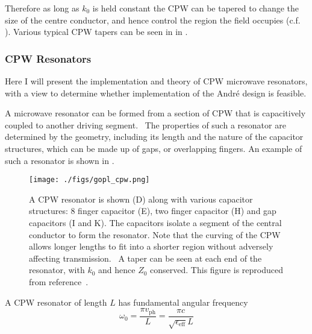 Therefore as long as $k_0$ is held constant the CPW can be tapered to change the
size of the centre conductor, and hence control the region the field occupies
(c.f. ).  Various typical CPW tapers  can be
seen in in .~\cite{Simons2004}

\subsubsection{CPW Resonators}
\label{experiment:mw:resonator}

Here I will present the implementation and theory of CPW microwave resonators,
with a view to determine whether implementation of the Andr\'e design is
feasible.

A microwave resonator can be formed from a section of CPW that is capacitively
coupled to another driving segment.~\cite{Day2003} The properties of such a
resonator are determined by the geometry, including its length and the nature
of the capacitor structures, which can be made up of gaps, or overlapping
fingers. An example of such a resonator is shown in
.~\cite{doi:10.1063/1.3010859, Pain1999}

\begin{figure}
  \texttt{[image: ./figs/gopl\_cpw.png]}
  \caption{
    A CPW resonator is shown (D) along with various capacitor structures: 8
    finger capacitor (E), two finger capacitor (H) and gap capacitors (I and K).
    The capacitors isolate a segment of the central conductor to form the
    resonator. Note that the curving of the CPW allows longer lengths to fit
    into a shorter region without adversely affecting
    transmission.~\cite{Simons2004} A taper can be seen at each end of the
    resonator, with $k_0$ and hence $Z_0$ conserved.
    This figure is reproduced from reference~\cite{doi:10.1063/1.3010859}.
  }
  \label{experiment:fig:resonator}
\end{figure}

A CPW resonator of length $L$ has fundamental angular frequency
\begin{equation}
  \omega_0 = \frac{\pi v_\mathrm{ph}}{L} = \frac{\pi
  c}{\sqrt{\epsilon_\text{eff}} L}
\end{equation}

